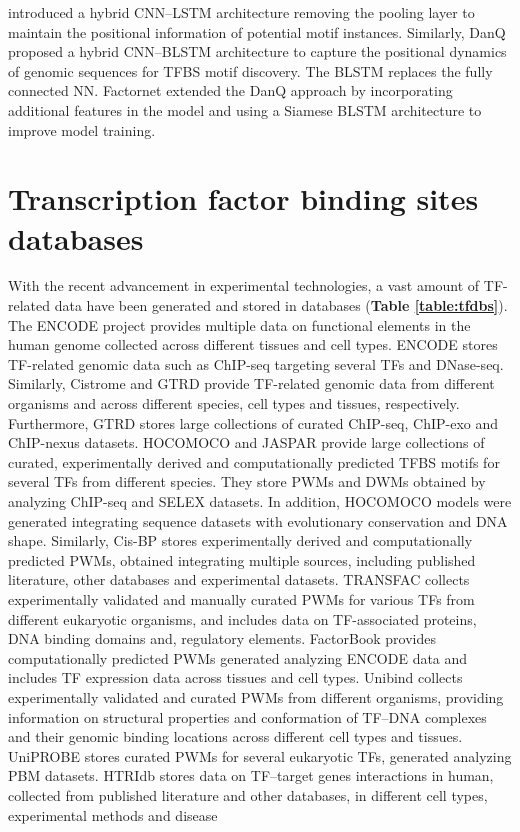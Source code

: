 \documentclass[a4paper, titlepage, openright]{book}
\begin{document}
\citep{hassanzadeh2016deeperbind}  introduced a hybrid CNN–LSTM architecture removing the pooling layer to maintain the positional information of potential motif instances. Similarly, DanQ  \citep{quang2016danq}  proposed a hybrid CNN–BLSTM architecture to capture the positional dynamics of genomic sequences for TFBS motif discovery. The BLSTM replaces the fully connected NN. Factornet \citep{quang2019factornet} extended the DanQ approach by incorporating additional features in the model and using a Siamese BLSTM architecture to improve model training.
\section{Transcription factor binding sites databases}
With the recent advancement in experimental technologies, a vast amount of TF-related data have been generated and stored in databases (\textbf{Table \ref{table:tfdbs}}). The ENCODE project \citep{encode2012integrated} provides multiple data on functional elements in the human genome collected across different tissues and cell types. ENCODE stores TF-related genomic data such as ChIP-seq targeting several TFs and DNase-seq. Similarly, Cistrome \citep{zheng2019cistrome} and GTRD \citep{kolmykov2021gtrd} provide TF-related genomic data from different organisms and across different species, cell types and tissues, respectively. Furthermore, GTRD stores large collections of curated ChIP-seq, ChIP-exo and ChIP-nexus datasets. HOCOMOCO  \citep{kulakovskiy2013hocomoco, kulakovskiy2018hocomoco} and JASPAR  \citep{sandelin2004jaspar, fornes2020jaspar} provide large collections of curated, experimentally derived and computationally predicted TFBS motifs for several TFs from different species. They store PWMs and DWMs obtained by analyzing ChIP-seq and SELEX datasets. In addition, HOCOMOCO models were generated integrating sequence datasets with evolutionary conservation and DNA shape. Similarly, Cis-BP \citep{weirauch2014determination} stores experimentally derived and computationally predicted PWMs, obtained integrating multiple sources, including published literature, other databases and experimental datasets. TRANSFAC \citep{wingender1996transfac, wingender2000transfac} collects experimentally validated and manually curated PWMs for various TFs from different eukaryotic organisms, and includes data on TF-associated proteins, DNA binding domains and, regulatory elements. FactorBook \citep{pratt2022factorbook} provides computationally predicted PWMs generated analyzing ENCODE data and includes TF expression data across tissues and cell types. Unibind \citep{puig2021unibind} collects experimentally validated and curated PWMs from different organisms, providing information on structural properties and conformation of TF–DNA complexes and their genomic binding locations across different cell types and tissues. UniPROBE \citep{newburger2009uniprobe} stores curated PWMs for several eukaryotic TFs, generated analyzing PBM datasets. HTRIdb \citep{bovolenta2012htridb} stores data on TF–target genes interactions in human, collected from published literature and other databases, in different cell types, experimental methods and disease 
\end{document}
